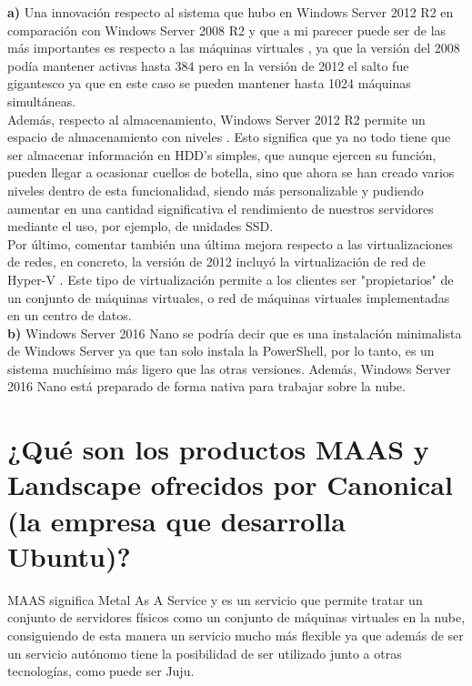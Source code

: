 \textbf{a)} Una innovación respecto al sistema que hubo en Windows Server 2012 R2 en comparación con Windows Server 2008 R2 y que a mi parecer puede ser de las más importantes es respecto a las máquinas virtuales \cite{microsoftmv}, ya que la versión del 2008 podía mantener activas hasta 384 pero en la versión de 2012 el salto fue gigantesco ya que en este caso se pueden mantener hasta 1024 máquinas simultáneas. \\



Además, respecto al almacenamiento, Windows Server 2012 R2 permite un espacio de almacenamiento con niveles \cite{seagatelevels}. Esto significa que ya no todo tiene que ser almacenar información en HDD's simples, que aunque ejercen su función, pueden llegar a ocasionar cuellos de botella, sino que ahora se han creado varios niveles dentro de esta funcionalidad, siendo más personalizable y pudiendo aumentar en una cantidad significativa el rendimiento de nuestros servidores mediante el uso, por ejemplo, de unidades SSD.\\




Por último, comentar también una última mejora respecto a las virtualizaciones de redes, en concreto, la versión de 2012 incluyó la virtualización de red de Hyper-V \cite{hyperV}. Este tipo de virtualización permite a los clientes ser "propietarios" de un conjunto de máquinas virtuales, o red de máquinas virtuales  implementadas en un centro de datos. \\

 
\textbf{b)} Windows Server 2016 Nano \cite{wnano} se podría decir que es una instalación minimalista de Windows Server ya que tan solo instala la PowerShell, por lo tanto, es un sistema muchísimo más ligero que las otras versiones. Además, Windows Server 2016 Nano está preparado de forma nativa para trabajar sobre la nube.


\section{¿Qué son los productos MAAS y Landscape ofrecidos por Canonical (la empresa que desarrolla Ubuntu)?}
MAAS \cite{MAAS} significa Metal As A Service y es un servicio que permite tratar un conjunto de servidores físicos como un conjunto de máquinas virtuales en la nube, consiguiendo de esta manera un servicio mucho más flexible ya que además de ser un servicio autónomo tiene la posibilidad de ser utilizado junto a otras tecnologías, como puede ser Juju. \\


